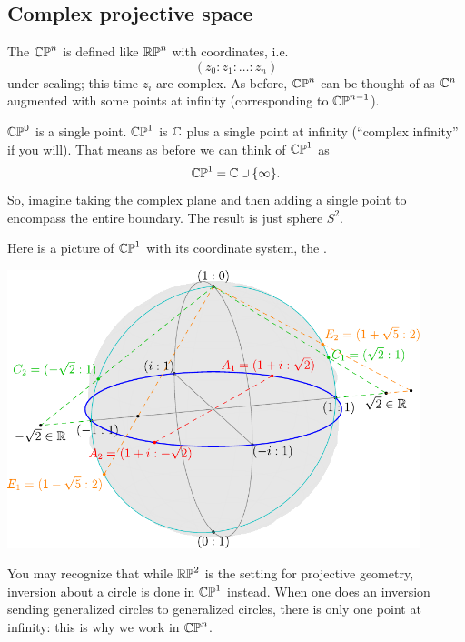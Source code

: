 \subsection*{Complex projective space}
The  $\mathbb{CP}^n$ is
defined like $\mathbb{RP}^n$ with coordinates, i.e.\
\[ (z_0 : z_1 : \dots : z_n) \]
under scaling; this time $z_i$ are complex.
As before, $\mathbb{CP}^n$ can be thought of as $\mathbb C^n$ augmented
with some points at infinity (corresponding to $\mathbb{CP}^{n-1}$).
\begin{example}
	\listhack
	\begin{enumerate}[(a)]
		\ii $\mathbb{CP}^0$ is a single point.
		\ii $\mathbb{CP}^1$ is $\mathbb C$ plus a single point at infinity
		(``complex infinity'' if you will).
		That means as before we can think of $\mathbb{CP}^1$ as
		\[ \mathbb{CP}^1 = \mathbb C \cup \{\infty\}. \]
		So, imagine taking the complex plane and then adding
		a single point to encompass the entire boundary.
		The result is just sphere $S^2$.
	\end{enumerate}
	Here is a picture of $\mathbb{CP}^1$ with its coordinate system,
	the .
	\begin{center}
		\includegraphics[width=0.9\textwidth]{media/earth.pdf}
	\end{center}
\end{example}

\begin{remark}
	You may recognize that while $\mathbb{RP}^2$ is the setting for projective geometry,
	inversion about a circle is done in $\mathbb{CP}^1$ instead.
	When one does an inversion sending generalized circles to generalized
	circles, there is only one point at infinity:
	this is why we work in $\mathbb{CP}^n$.
\end{remark}

